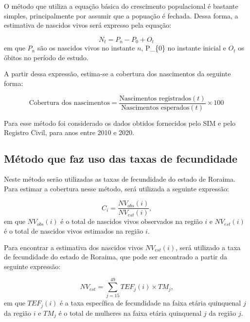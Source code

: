 \documentclass[
  12pt,
  a4paper,
]{scrreprt}
\begin{document}
O método que utiliza a equação básica do crescimento populacional é
bastante simples, principalmente por assumir que a popuação é fechada.
Dessa forma, a estimativa de nascidos vivos será expresso pela equação:

\[
N_t = P_n - P_{0} + O_t
\] em que \(P_n\) são os nascidos vivos no instante \(n\), P\_\{0\} no
instante inicial e \(O_t\) os óbitos no período de estudo.

\vspace{12pt}

A partir dessa expressão, estima-se a cobertura dos nascimentos da
seguinte forma:

\[
\text{Cobertura dos nascimentos} = \frac{\text{Nascimentos registrados}\left(t\right)}{\text{Nascimentos esperados}\left(t\right)} \times 100
\]

\vspace{12pt}

Para esse método foi considerado os dados obtidos fornecidos pelo SIM e
pelo Registro Civil, para anos entre 2010 e 2020.

\subsection{Método que faz uso das taxas de
fecundidade}\label{muxe9todo-que-faz-uso-das-taxas-de-fecundidade}

Neste método serão utilizadas as taxas de fecundidade do estado de
Roraima. Para estimar a cobertura nesse método, será utilizada a
seguinte expressão:

\[
C_i = \frac{NV_{obs}\left(i\right)}{NV_{est}\left(i\right)} \text{,}
\] em que \(NV_{obs}\left(i\right)\) é o total de nascidos vivos
observados na região \(i\) e \(NV_{est}\left(i\right)\) é o total de
nascidos vivos estimados na região \(i\).

\vspace{12pt}

Para encontrar a estimativa dos nascidos vivos
\(NV_{est}\left(i\right)\), será utilizado a taxa de fecundidade do
estado de Roraima, que pode ser encontrado a partir da seguinte
expressão:

\[
NV_{est} = \sum^{49}_{j=15} TEF_{j}\left(i\right) \times TM_{j} \text{,}
\] em que \(TEF_{j}\left(i\right)\) é a taxa específica de fecundidade
na faixa etária quinquenal \(j\) da região \(i\) e \(TM_j\) é o total de
mulheres na faixa etária quinquenal \(j\) da região \(j\).

\vspace{12pt}
\end{document}
